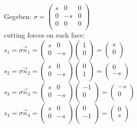 \documentclass[a4paper]{scrartcl}
\begin{document}
\begin{minipage}{14cm}
Gegeben: $\sigma = \begin{pmatrix}
s & 0 & 0\\
0 & -s & 0\\
0 & 0 & 0\\
\end{pmatrix} $\\
cutting forces on each face:\\
$s_1 = \sigma \vec n_1 = \begin{pmatrix}
s & 0\\
0 & -s\\
\end{pmatrix} \begin{pmatrix}
1\\
0\\
\end{pmatrix} = \begin{pmatrix}
s\\
0\\
\end{pmatrix}$\\

$s_2 = \sigma \vec n_2 = \begin{pmatrix}
s & 0\\
0 & -s\\
\end{pmatrix} \begin{pmatrix}
0\\
1\\
\end{pmatrix} = \begin{pmatrix}
0\\
-s\\
\end{pmatrix}$\\

$s_3 = \sigma \vec n_3 = \begin{pmatrix}
s & 0\\
0 & -s\\
\end{pmatrix} \begin{pmatrix}
-1\\
0\\
\end{pmatrix} = \begin{pmatrix}
-s\\
0\\
\end{pmatrix}$\\

$s_4 = \sigma \vec n_4 = \begin{pmatrix}
s & 0\\
0 & -s\\
\end{pmatrix} \begin{pmatrix}
0\\
-1\\
\end{pmatrix} = \begin{pmatrix}
0\\
s\\
\end{pmatrix}$

\end{minipage}
\end{document}
